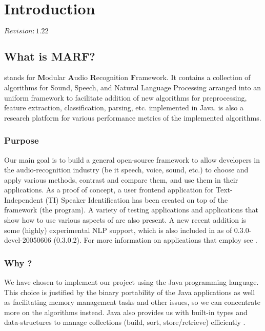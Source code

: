 \chapter{Introduction}

$Revision: 1.22 $

\section{What is MARF?}

{\marf} stands for {\bf M}odular {\bf A}udio {\bf R}ecognition {\bf F}ramework.
It contains a collection of algorithms for Sound, Speech, and Natural Language
Processing arranged into an uniform framework to facilitate addition of new
algorithms for preprocessing, feature extraction, classification, parsing, etc.
implemented in Java.
{\marf} is also a research platform for various performance metrics of the
implemented algorithms.

\subsection{Purpose}

Our main goal is to build a general open-source framework to allow developers in the
audio-recognition industry (be it speech, voice, sound, etc.) to choose and apply various methods,
contrast and compare them, and use them in their applications. As a proof of concept, a
user frontend application for Text-Independent (TI) Speaker Identification has
been created on top of the framework (the  program). A variety
of testing applications and applications that show how to use various aspects of {\marf}
are also present. A new recent addition is some (highly) experimental NLP support, which is also
included in {\marf} as of 0.3.0-devel-20050606 (0.3.0.2). For more information on applications
that employ {\marf} see .

\subsection{Why {\java}?}

We have chosen to implement our project using the Java programming language. This
choice is justified by the binary portability of the Java applications as well as
facilitating memory management tasks and other issues, so we can concentrate more on
the algorithms instead. Java also provides
us with built-in types and data-structures to manage
collections (build, sort, store/retrieve) efficiently \cite{javanuttshell}.

